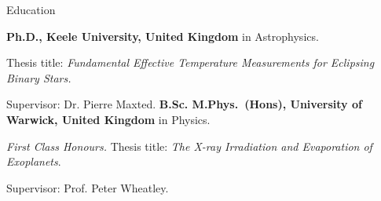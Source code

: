 \begin{rubric}{Education}

\entry*[2018 -- 2022]%
	\textbf{Ph.D., Keele University, United Kingdom} in Astrophysics.
	\par Thesis title: \emph{Fundamental Effective Temperature Measurements for Eclipsing Binary Stars.} \par Supervisor: Dr. Pierre Maxted.
%
\entry*[2014 -- 2018]%
	\textbf{B.Sc. M.Phys.~(Hons), University of Warwick, United Kingdom} in Physics.
	\par \emph{First Class Honours.}
	Thesis title: \emph{The X-ray Irradiation and Evaporation of Exoplanets}. \par Supervisor: Prof. Peter Wheatley.
\end{rubric}